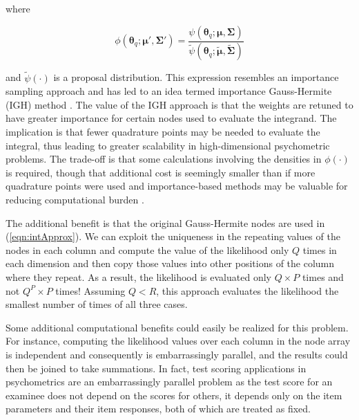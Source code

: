 \documentclass[12pt]{article}
\begin{document}
\noindent where

\begin{equation}
\label{eqn:mixing}
\phi(\boldsymbol{\theta}_q;\boldsymbol{\mu}',\boldsymbol{\Sigma'}) = \frac{\psi(\boldsymbol{\theta}_q;\boldsymbol{\mu},\boldsymbol{\Sigma})}{\widetilde{\psi}(\boldsymbol{\theta}_q;\widetilde{\boldsymbol{\mu}},\widetilde{\boldsymbol{\Sigma}})}
\end{equation}

\noindent and $\widetilde{\psi}(\cdot)$ is a proposal distribution. This expression resembles an importance sampling approach \cite{gelman} and has led to an idea termed importance Gauss-Hermite (IGH) method \cite{elvira}. The value of the IGH approach is that the weights are retuned to have greater importance for certain nodes used to evaluate the integrand. The implication is that fewer quadrature points may be needed to evaluate the integral, thus leading to greater scalability in high-dimensional psychometric problems. The trade-off is that some calculations involving the densities in $\phi(\cdot)$ is required, though that additional cost is seemingly smaller than if more quadrature points were used and importance-based methods may be valuable for reducing computational burden \cite{Ackerberg}. 

The additional benefit is that the original Gauss-Hermite nodes are used in (\ref{eqn:intApprox}). We can exploit the uniqueness in the repeating values of the nodes in each column and compute the value of the likelihood only $Q$ times in each dimension and then copy those values into other positions of the column where they repeat. As a result, the likelihood is evaluated only $Q \times P$ times and not $Q^P \times P$ times! Assuming $Q < R$, this approach evaluates the likelihood the smallest number of times of all three cases. 

Some additional computational benefits could easily be realized for this problem. For instance, computing the likelihood values over each column in the node array is independent and consequently is embarrassingly parallel, and the results could then be joined to take summations. In fact, test scoring applications in psychometrics are an embarrassingly parallel problem as the test score for an examinee does not depend on the scores for others, it depends only on the item parameters and their item responses, both of which are treated as fixed. 
\end{document}
